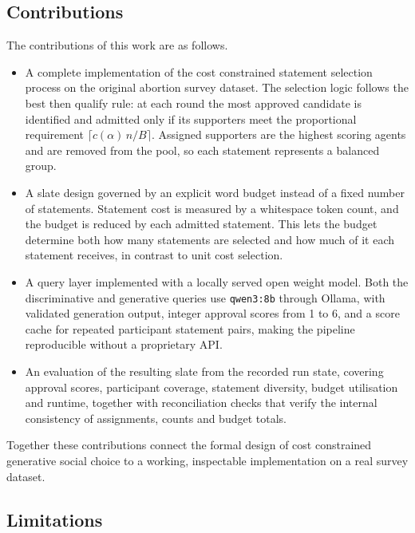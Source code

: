 \documentclass[letterpaper,11pt]{article}
\theoremstyle{plain}
\theoremstyle{definition}
\begin{document}
\subsection{Contributions}

The contributions of this work are as follows.

\begin{itemize}
\item A complete implementation of the cost constrained statement selection process on the original abortion survey dataset. The selection logic follows the best then qualify rule: at each round the most approved candidate is identified and admitted only if its supporters meet the proportional requirement $\lceil c(\alpha)\,n/B\rceil$. Assigned supporters are the highest scoring agents and are removed from the pool, so each statement represents a balanced group. \smallskip

\item A slate design governed by an explicit word budget instead of a fixed number of statements. Statement cost is measured by a whitespace token count, and the budget is reduced by each admitted statement. This lets the budget determine both how many statements are selected and how much of it each statement receives, in contrast to unit cost selection. \smallskip

\item A query layer implemented with a locally served open weight model. Both the discriminative and generative queries use \texttt{qwen3:8b} through Ollama, with validated generation output, integer approval scores from 1 to 6, and a score cache for repeated participant statement pairs, making the pipeline reproducible without a proprietary API. \smallkip

\item An evaluation of the resulting slate from the recorded run state, covering approval scores, participant coverage, statement diversity, budget utilisation and runtime, together with reconciliation checks that verify the internal consistency of assignments, counts and budget totals.
\end{itemize}

Together these contributions connect the formal design of cost constrained generative social choice to a working, inspectable implementation on a real survey dataset.

\subsection{Limitations}
\end{document}
